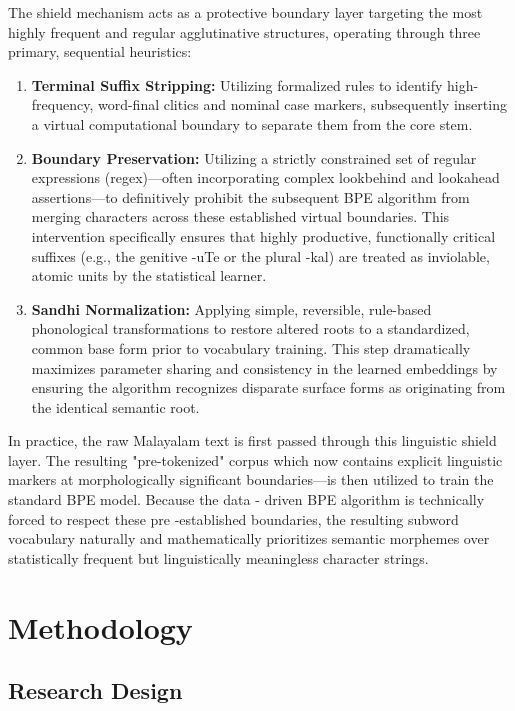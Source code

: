 \documentclass[12pt]{article}
\begin{document}
The shield mechanism acts as a protective boundary layer targeting the most highly frequent and regular agglutinative structures, operating through three primary, sequential heuristics: 
\begin{enumerate}
\item
\textbf{Terminal Suffix Stripping: }Utilizing formalized rules to identify high-frequency, word-final clitics and nominal case markers, subsequently inserting a virtual computational boundary to separate them from the core stem.
\item
\textbf{Boundary Preservation:} Utilizing a strictly constrained set of regular expressions (regex)—often incorporating complex lookbehind and lookahead assertions—to definitively prohibit the subsequent BPE algorithm from merging characters across these established virtual boundaries. This intervention specifically ensures that highly productive, functionally critical suffixes (e.g., the genitive -uTe or the plural -kal) are treated as inviolable, atomic units by the statistical learner.
\item
\textbf{Sandhi Normalization:} Applying simple, reversible, rule-based phonological transformations to restore altered roots to a standardized, common base form prior to vocabulary training. This step dramatically maximizes parameter sharing and consistency in the learned embeddings by ensuring the algorithm recognizes disparate surface forms as originating from the identical semantic root. 

\end{enumerate}
In practice, the raw Malayalam text is first passed through this linguistic shield layer. The resulting "pre-tokenized" corpus which now contains explicit linguistic markers at morphologically significant boundaries—is then utilized to train the standard BPE model. Because the data - driven BPE algorithm is technically forced to respect these pre -established boundaries, the resulting subword vocabulary naturally and mathematically prioritizes semantic morphemes over statistically frequent but linguistically meaningless character strings. 

\pagebreak
\newpage

\section{Methodology}



\subsection{Research Design}
\end{document}

